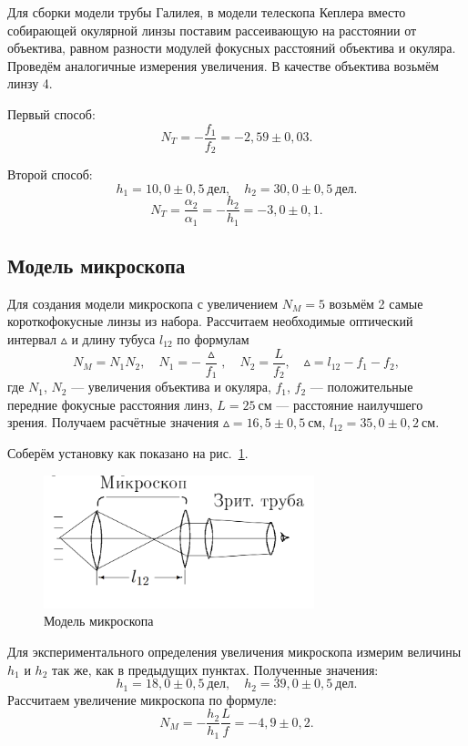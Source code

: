\documentclass[a4paper, 12pt]{article}
\begin{document}
Для сборки модели трубы Галилея, в модели телескопа Кеплера вместо собирающей окулярной линзы поставим рассеивающую на расстоянии от объектива, равном разности модулей фокусных расстояний объектива и окуляра. Проведём аналогичные измерения увеличения. В качестве объектива возьмём линзу 4.

Первый способ:
$$N_T = -\frac{f_1}{f_2} = -2,59\pm0,03.$$

Второй способ:
$$h_1 = 10,0\pm0,5~дел, \quad h_2 = 30,0\pm0,5~дел.$$
$$N_T = \frac{\alpha_2}{\alpha_1} = -\frac{h_2}{h_1} = -3,0\pm0,1.$$

\subsection{Модель микроскопа}

Для создания модели микроскопа с увеличением $N_M = 5$ возьмём 2 самые короткофокусные линзы из набора. Рассчитаем необходимые оптический интервал $\vartriangle$ и длину тубуса $l_{12}$ по формулам $$N_M = N_1 N_2, \quad N_1 = -\frac{\vartriangle}{f_1}, \quad N_2 = \frac{L}{f_2}, \quad \vartriangle = l_{12} - f_1 - f_2,$$
где $N_1$, $N_2$ --- увеличения объектива и окуляра, $f_1$, $f_2$ --- положительные передние фокусные расстояния линз, $L = 25~см$ --- расстояние наилучшего зрения. Получаем расчётные значения $\vartriangle = 16,5\pm0,5~см$, $l_{12} = 35,0\pm0,2~см$.

Соберём установку как показано на рис.~\ref{fig:micro}.

\begin{figure}[h!]
\begin{center}
    \includegraphics[width=0.7\textwidth]{micro.png}
\end{center}
\caption{Модель микроскопа}
\label{fig:micro}
\end{figure}

Для экспериментального определения увеличения микроскопа измерим величины $h_1$ и $h_2$ так же, как в предыдущих пунктах. Полученные значения: $$h_1 = 18,0\pm0,5~дел, \quad h_2 = 39,0\pm0,5~дел.$$ Рассчитаем увеличение микроскопа по формуле:
$$ N_M = -\frac{h_2}{h_1}\frac{L}{f} = -4,9\pm0,2.$$
\end{document}
